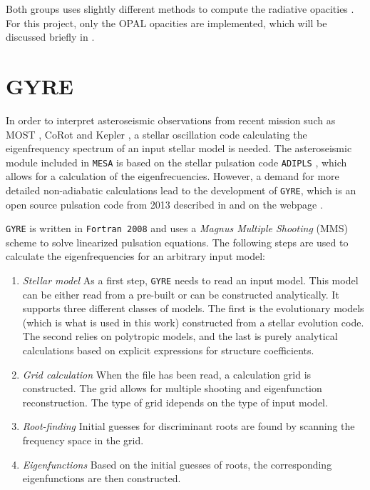Both groups uses slightly different methods to compute the radiative opacities \citep{seaton2004comparison}. For this project, only the OPAL opacities are implemented, which will be discussed briefly in . 
\section{GYRE}
\label{sec:gyre}

In order to interpret asteroseismic observations from recent mission such as MOST \citep{walker2003most,matthews2007one}, CoRot \citep{michel2008first} and Kepler \citep{borucki2009transiting, gilliland2010kepler}, a stellar oscillation code calculating
the eigenfrequency spectrum of an input stellar model is needed. 
The asteroseismic module included in \texttt{MESA} is based on the stellar pulsation code \texttt{ADIPLS} \citep{christensen2008adipls}, which allows for a calculation of the eigenfrecuencies. However, a demand for more detailed non-adiabatic calculations lead to the development of \texttt{GYRE}, which is an open source pulsation code from 2013 described in  \citep{townsend2013, townsend2017} and on the webpage \citep{bitgyre}. 

\texttt{GYRE} is written in \texttt{Fortran 2008} and uses a \textit{Magnus Multiple Shooting} (MMS) scheme to solve linearized pulsation equations. The following steps are used to calculate the eigenfrequencies for an arbitrary input model:

\begin{enumerate}
    \item \emph{Stellar model} As a first step, \texttt{GYRE} needs to read an input model. This model can be either read from a pre-built or can be constructed analytically. It supports three different classes of models. The first is the evolutionary models (which is what is used in this work) constructed from a stellar evolution code. The second relies on polytropic models, and the last is purely analytical calculations based on explicit expressions for structure coefficients. 
    \item \emph{Grid calculation} When the file has been read, a calculation grid is constructed. The grid allows for multiple shooting and eigenfunction reconstruction. The type of grid idepends on the type of input model. 
    \item \emph{Root-finding} Initial guesses for discriminant roots are found by scanning the frequency space in the grid. 
    \item \emph{Eigenfunctions} Based on the initial guesses of roots, the corresponding eigenfunctions are then constructed. 
\end{enumerate}

